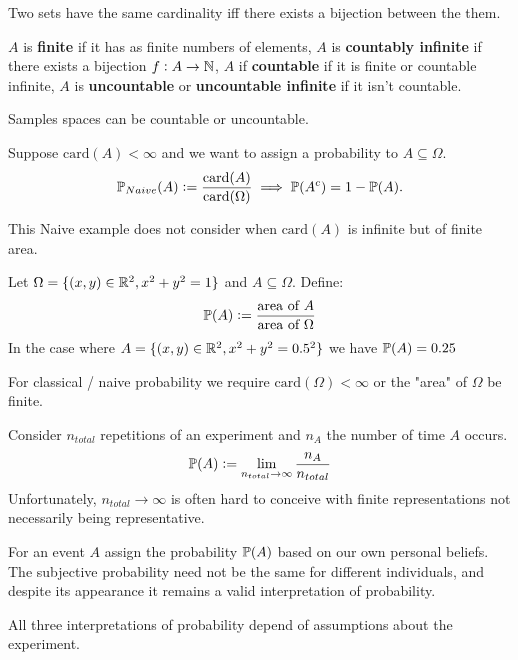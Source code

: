\begin{definition}
    Two sets have the same cardinality iff there exists a bijection between the them.
\end{definition}

\begin{definition}
    $A$ is \textbf{finite} if it has as finite numbers of elements, $A$ is \textbf{countably infinite} if there exists a bijection $f: A \to \mathbb{N}$, $A$ if \textbf{countable} if it is finite or countable infinite, $A$ is \textbf{uncountable} or \textbf{uncountable infinite} if it isn't countable.
\end{definition}

Samples spaces can be countable or uncountable.

\begin{definition}
    Suppose $\text{card}(A) < \infty$ and we want to assign a probability to $A \subseteq \Omega$.
    \[
    \mathbb{P}_{Naive}(A) := \frac{\text{card}(A)}{\text{card}(\Omega)} \implies \mathbb{P}(A^c) = 1 - \mathbb{P}(A)  \textcolor{black}{.}
    \]
\end{definition}
This Naive example does not consider when $\text{card}(A)$ is infinite but of finite area.
\begin{example}
    Let $\Omega = \{(x,y) \in \mathbb{R}^2, x^2+y^2=1\}$ and $A\subseteq\Omega$. Define: 
    \[
    \mathbb{P}(A) := \frac{\text{area of } A}{\text{area of } \Omega}
    \]
    In the case where $A = \{(x,y) \in \mathbb{R}^2, x^2+y^2=0.5^2\}$ we have $\mathbb{P}(A) = 0.25$
\end{example}
\begin{remark}
    For classical / naive probability we require $\text{card}(\Omega) < \infty$ or the "area" of $\Omega$ be finite. 
\end{remark}

\begin{definition}
    Consider $n_{total}$ repetitions of an experiment and $n_A$ the number of time $A$ occurs.
    \[\mathbb{P}(A) := \lim_{n_{total} \to \infty} \frac{n_A}{n_{total}}\]
    Unfortunately, $n_{total} \to \infty$ is often hard to conceive with finite representations not necessarily being representative.
\end{definition}

\begin{definition}
    For an event $A$ assign the probability $\mathbb{P}(A)$ based on our own personal beliefs. The subjective probability need not be the same for different individuals, and despite its appearance it remains a valid interpretation of probability.
\end{definition}

\begin{remark}
    All three interpretations of probability depend of assumptions about the experiment.
\end{remark}

